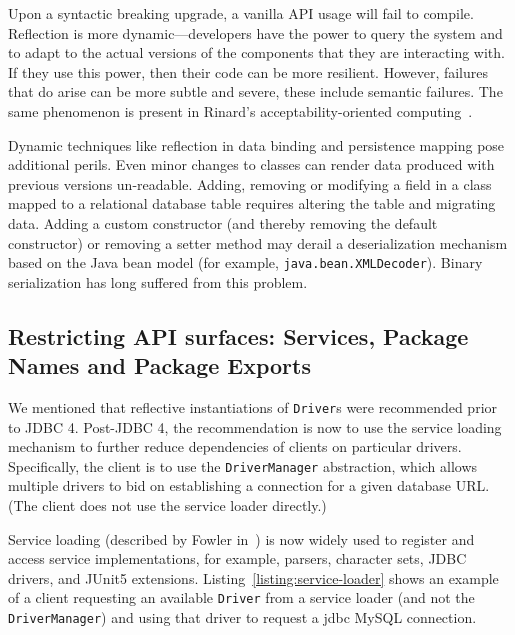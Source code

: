 Upon a syntactic breaking upgrade, a vanilla API usage will fail to compile. Reflection is more dynamic---developers have the power to query the system and to adapt to the actual versions of the components that they are interacting with. If they use this power, then their code can be more resilient. However, failures that do arise can be more subtle and severe, these include semantic failures. The same phenomenon is present in Rinard's acceptability-oriented computing~\cite{rinard03:_accep}.

Dynamic techniques like reflection in data binding and persistence mapping pose additional perils. Even minor changes to classes can render data produced with previous versions un-readable. Adding, removing or modifying a field in a class mapped to a relational database table requires altering the table and migrating data. Adding a custom constructor (and thereby removing the default constructor) or removing a setter method may derail a deserialization mechanism based on the Java bean model (for example, \texttt{java.bean.XMLDecoder}). Binary serialization has long suffered from this problem. 

\subsection{Restricting API surfaces: Services, Package Names and Package Exports}
We mentioned that reflective instantiations of \texttt{Driver}s were recommended prior to JDBC 4. Post-JDBC 4, the recommendation is now to use the service loading mechanism to further reduce dependencies of clients on particular drivers. Specifically, the client is to use the \texttt{DriverManager} abstraction, which allows multiple drivers to bid on establishing a connection for a given database URL. (The client does not use the service loader directly.) 



Service loading (described by Fowler in~\cite{fowler04:_inver_contr_contain_depen_injec}) is now widely used to register and access service implementations, for example, parsers, character sets, JDBC drivers, and JUnit5 extensions. 
Listing~\ref{listing:service-loader} shows an example of a client requesting an available \texttt{Driver} from a service loader (and not the {\tt DriverManager}) and using that driver to request a jdbc MySQL connection.

